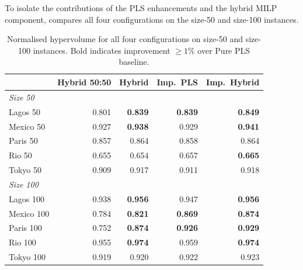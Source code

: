 \documentclass[11pt,a4paper]{article}
\begin{document}
To isolate the contributions of the PLS enhancements and the hybrid MILP
component,  compares all four configurations on the
size-50 and size-100 instances.

\begin{table}[t]
\centering
\caption{Normalised hypervolume for all four configurations on size-50
  and size-100 instances.  Bold indicates improvement $\ge 1\%$ over
  Pure PLS baseline.}\label{tab:ablation}
\small
\begin{tabular}{lrrrr}
\toprule
& \textbf{Hybrid 50:50} & \textbf{Hybrid} &
  \textbf{Imp.\ PLS} & \textbf{Imp.\ Hybrid} \\
\midrule
\multicolumn{5}{l}{\textit{Size 50}} \\
Lagos 50   & 0.801 & \textbf{0.839} & \textbf{0.839} & \textbf{0.849} \\
Mexico 50  & 0.927 & \textbf{0.938} & 0.929 & \textbf{0.941} \\
Paris 50   & 0.857 & 0.864 & 0.858 & 0.864 \\
Rio 50     & 0.655 & 0.654 & 0.657 & \textbf{0.665} \\
Tokyo 50   & 0.909 & 0.917 & 0.911 & 0.918 \\
\midrule
\multicolumn{5}{l}{\textit{Size 100}} \\
Lagos 100   & 0.938 & \textbf{0.956} & 0.947 & \textbf{0.956} \\
Mexico 100  & 0.784 & \textbf{0.821} & \textbf{0.869} & \textbf{0.874} \\
Paris 100   & 0.752 & \textbf{0.874} & \textbf{0.926} & \textbf{0.929} \\
Rio 100     & 0.955 & \textbf{0.974} & 0.959 & \textbf{0.974} \\
Tokyo 100   & 0.919 & 0.920 & 0.922 & 0.923 \\
\bottomrule
\end{tabular}
\end{table}
\end{document}
